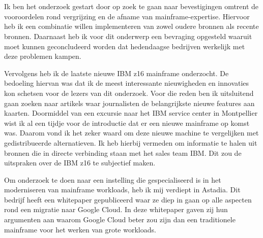 
\chapter{}
\label{ch:methodologie}



\section{}
\label{sec:De literatuur- en vergelijkende studie}

Ik ben het onderzoek gestart door op zoek te gaan naar bevestigingen omtrent de vooroordelen rond vergrijzing en de afname van mainframe-expertise. Hiervoor heb ik een combinatie willen implementeren van zowel oudere bronnen als recente bronnen. Daarnaast heb ik voor dit onderwerp een bevraging opgesteld waaruit moet kunnen geconcludeerd worden dat hedendaagse bedrijven werkelijk met deze problemen kampen. 

Vervolgens heb ik de laatste nieuwe IBM z16 mainframe onderzocht. De bedoeling hiervan was dat ik de meest interessante nieuwigheden en innovaties kon schetsen voor de lezers van dit onderzoek. Voor die reden ben ik uitsluitend gaan zoeken naar artikels waar journalisten de belangrijkste nieuwe features aan kaarten. Doormiddel van een excursie naar het IBM service center in Montpellier wist ik al een tijdje voor de introductie dat er een nieuwe mainframe op komst was. Daarom vond ik het zeker waard om deze nieuwe machine te vergelijken met gedistribueerde alternatieven. Ik heb hierbij vermeden om informatie te halen uit bronnen die in directe verbinding staan met het sales team IBM. Dit zou de uitspraken over de IBM z16 te subjectief maken. 

Om onderzoek te doen naar een instelling die gespecialiseerd is in het moderniseren van mainframe workloads, heb ik mij verdiept in Astadia. Dit bedrijf heeft een whitepaper gepubliceerd waar ze diep in gaan op alle aspecten rond een migratie naar Google Cloud. In deze whitepaper gaven zij hun argumenten aan waarom Google Cloud beter zou zijn dan een traditionele mainframe voor het werken van grote workloads. 


